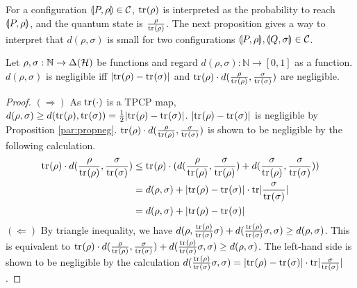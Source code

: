 For a configuration $\llparenthesis P, \rho \rrparenthesis \in \mathcal{C}$, ${\rm tr}_{}(\rho)$ is 
interpreted
as the probability to reach $\llparenthesis P, \rho \rrparenthesis$, and the quantum state  
is $\frac{\rho}{{\rm tr}_{}(\rho)}$.
The next proposition 
gives a way to interpret that $d(\rho, \sigma)$ is 
small for two configurations $\llparenthesis P, \rho \rrparenthesis, \llparenthesis Q, \sigma \rrparenthesis \in \mathcal{C}$.
\begin{prop}
\label{par:trdisproperty}
 Let $\rho, \sigma : \mathbb{N} \rightarrow \Delta(\mathcal{H})$ be functions
 and regard $d(\rho, \sigma):\mathbb{N} \rightarrow [0,1]$ 
 as a function. $d(\rho, \sigma)$
 is negligible iff $|{\rm tr}_{}(\rho) - {\rm tr}_{}(\sigma)|$ and
 ${\rm tr}_{}(\rho)\cdot d(\frac{\rho}{{\rm tr}_{}(\rho)},
 \frac{\sigma}{{\rm tr}_{}(\sigma)})$ are negligible.
\end{prop}

\begin{proof}
 $\mathrm{(\Rightarrow)}$ As ${\rm tr}_{}(\cdot)$ is a TPCP map, $d(\rho,
 \sigma) \ge d({\rm tr}_{}(\rho), {\rm tr}_{}(\sigma)) = \frac{1}{2}|{\rm tr}_{}(\rho) - 
 {\rm tr}_{}(\sigma)|$. $|{\rm tr}_{}(\rho) -  {\rm tr}_{}(\sigma)|$ is negligible by
 Proposition \ref{par:propneg}.
 ${\rm tr}_{}(\rho)\cdot d(\frac{\rho}{{\rm tr}_{}(\rho)}, \frac{\sigma}{{\rm tr}_{}(\sigma)})$
 is shown to be negligible by the following calculation.
 \begin{align*}
  {\rm tr}_{}(\rho)\cdot d(\frac{\rho}{{\rm tr}_{}(\rho)}, \frac{\sigma}{{\rm tr}_{}(\sigma)})
  &\le {\rm tr}_{}(\rho)\cdot (d(\frac{\rho}{{\rm tr}_{}(\rho)},
  \frac{\sigma}{{\rm tr}_{}(\rho)}) + d(\frac{\sigma}{{\rm tr}_{}(\rho)},
  \frac{\sigma}{{\rm tr}_{}(\sigma)}))\\
  &= d(\rho, \sigma) + |{\rm tr}_{}(\rho) -
  {\rm tr}_{}(\sigma)| \cdot \mathrm{tr}|\frac{\sigma}{{\rm tr}_{}(\sigma)}|\\
  &= d(\rho, \sigma) + |{\rm tr}_{}(\rho) - {\rm tr}_{}(\sigma)|
 \end{align*}
$\mathrm{(\Leftarrow)}$ By triangle inequality, we have
$d(\rho, \frac{{\rm tr}_{}(\rho)}{{\rm tr}_{}(\sigma)}\sigma) + 
 d(\frac{{\rm tr}_{}(\rho)}{{\rm tr}_{}(\sigma)}\sigma, \sigma)
 \ge d(\rho, \sigma)$. This is equivalent to
${\rm tr}_{}(\rho) \cdot d(\frac{\rho}{{\rm tr}_{}(\rho)},
 \frac{\sigma}{{\rm tr}_{}(\sigma)}) + 
 d(\frac{{\rm tr}_{}(\rho)}{{\rm tr}_{}(\sigma)}\sigma, \sigma)
 \ge d(\rho, \sigma)$. The left-hand side is shown to be negligible
 by the calculation $d(\frac{{\rm tr}_{}(\rho)}{{\rm tr}_{}(\sigma)}\sigma, \sigma)
 = 
|{\rm tr}_{}(\rho) -
  {\rm tr}_{}(\sigma)| \cdot \mathrm{tr}|\frac{\sigma}{{\rm tr}_{}(\sigma)}|$.
\end{proof}

